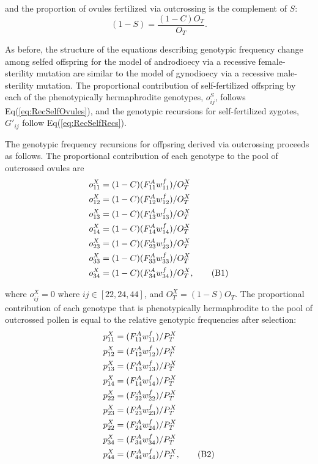 \documentclass{article}
\newcommand\numberthis{\addtocounter{equation}{1}\tag{\theequation}}
\begin{document}
\noindent and the proportion of ovules fertilized via outcrossing is the complement of $S$:
\begin{equation} 
(1 - S) = \frac{(1 - C)O_T}{O_T}.
\end{equation}

As before, the structure of the equations describing genotypic frequency change among selfed offspring for the model of androdioecy via a recessive female-sterility mutation are similar to the model of gynodioecy via a recessive male-sterility mutation. The proportional contribution of self-fertilized offspring by each of the phenotypically hermaphrodite genotypes, $o^S_{ij}$, follows Eq(\ref{eq:RecSelfOvules}), and the genotypic recursions for self-fertilized zygotes, $G'_{ij}$ follow Eq(\ref{eq:RecSelfRecs}).

The genotypic frequency recursions for offpsring derived via outcrossing proceeds as follows. The proportional contribution of each genotype to the pool of outcrossed ovules are
\begin{align*}
    o^X_{11} &= (1 - C) (F^A_{11} w^f_{11})/O^X_T \\
    o^X_{12} &= (1 - C) (F^A_{12} w^f_{12})/O^X_T \\
    o^X_{13} &= (1 - C) (F^A_{13} w^f_{13})/O^X_T \\
    o^X_{14} &= (1 - C) (F^A_{14} w^f_{14})/O^X_T \\
    o^X_{23} &= (1 - C) (F^A_{23} w^f_{23})/O^X_T \\
    o^X_{33} &= (1 - C) (F^A_{33} w^f_{33})/O^X_T \\
    o^X_{34} &= (1 - C) (F^A_{34} w^f_{34})/O^X_T, \numberthis
\end{align*}

\noindent where $o^X_{ij} = 0$ where $ij \in [22,24,44]$, and $O^X_T = (1 - S)O_T$. The proportional contribution of each genotype that is phenotypically hermaphrodite to the pool of outcrossed pollen is equal to the relative genotypic frequencies after selection:
\begin{align*}
    p^X_{11} &= (F^A_{11} w^f_{11}) / P^X_T \\
    p^X_{12} &= (F^A_{12} w^f_{12}) / P^X_T \\
    p^X_{13} &= (F^A_{13} w^f_{13}) / P^X_T \\
    p^X_{14} &= (F^A_{14} w^f_{14}) / P^X_T \\
    p^X_{22} &= (F^A_{22} w^f_{22}) / P^X_T \\
    p^X_{23} &= (F^A_{23} w^f_{23}) / P^X_T \\
    p^X_{22} &= (F^A_{24} w^f_{24}) / P^X_T \\
    p^X_{34} &= (F^A_{34} w^f_{34}) / P^X_T \\
    p^X_{44} &= (F^A_{44} w^f_{44}) / P^X_T , \numberthis
\end{align*}
\end{document}
